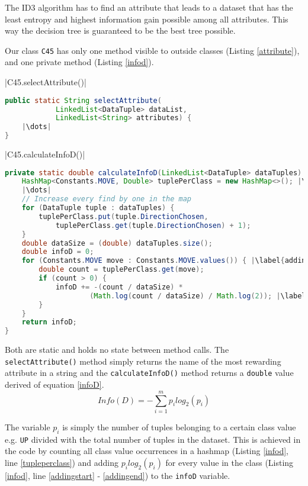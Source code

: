 \documentclass{article}
\begin{document}
    The ID3 algorithm has to find an attribute that leads to a dataset that has the least entropy and highest information gain possible among all attributes. This way the decision tree is guaranteed to be the best tree possible.

    Our class \verb|C45| has only one method visible to outside classes (Listing \ref{attribute}), and one private method (Listing \ref{infod}).

    |C45.selectAttribute()|
    \begin{lstlisting}[language=Java, caption=Method declaration of \protect\UseVerb{term}, label={attribute}, escapechar=|]
public static String selectAttribute(
            LinkedList<DataTuple> dataList,
            LinkedList<String> attributes) {
    |\dots|
}
    \end{lstlisting}

    |C45.calculateInfoD()|
    \begin{lstlisting}[language=Java, caption=Method definition of \protect\UseVerb{term2}, label={infod}, escapechar=|]
private static double calculateInfoD(LinkedList<DataTuple> dataTuples) {
    HashMap<Constants.MOVE, Double> tuplePerClass = new HashMap<>(); |\label{tupleperclass}|
    |\dots|
    // Increase every find by one in the map
    for (DataTuple tuple : dataTuples) {
        tuplePerClass.put(tuple.DirectionChosen,
            tuplePerClass.get(tuple.DirectionChosen) + 1);
    }
    double dataSize = (double) dataTuples.size();
    double infoD = 0;
    for (Constants.MOVE move : Constants.MOVE.values()) { |\label{addingstart}|
        double count = tuplePerClass.get(move);
        if (count > 0) {
            infoD += -(count / dataSize) *
                    (Math.log(count / dataSize) / Math.log(2)); |\label{addingend}|
        }
    }
    return infoD;
}\end{lstlisting}

    Both are static and holds no state between method calls. The \verb|selectAttribute()| method simply returns the name of the most rewarding attribute in a string and the \verb|calculateInfoD()| method returns a \verb|double| value derived of equation \ref{infoD}.
    \begin{equation} \label{infoD}
    Info(D)=-\sum_{i=1}^{m}p_i log_2(p_i)
    \end{equation}

    The variable $p_i$ is simply the number of tuples belonging to a certain class value e.g. \verb|UP| divided with the total number of tuples in the dataset. This is achieved in the code by counting all class value occurrences in a hashmap (Listing \ref{infod}, line \ref{tupleperclass}) and adding $p_i log_2(p_i)$ for every value in the class (Listing \ref{infod}, line \ref{addingstart} - \ref{addingend}) to the \verb|infoD| variable.
\end{document}
